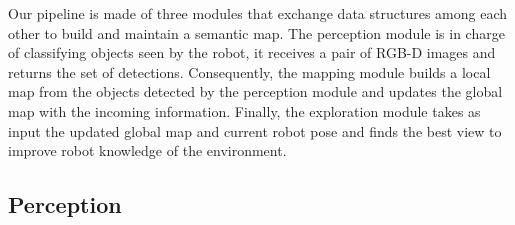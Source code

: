 \documentclass{article}
\begin{document}
%	
%	
	
	Our pipeline is made of three modules that exchange data structures among each other to build and maintain a semantic map. The perception module is in charge of classifying objects seen by the robot, it receives a pair of RGB-D images and returns the set of detections. Consequently, the mapping module builds a local map from the objects detected by the perception module and updates the global map with the incoming information. Finally, the exploration module takes as input the updated global map and current robot pose and finds the best view to improve robot knowledge of the environment.
	
	\subsection*{Perception}
	
%	
	
\end{document}
